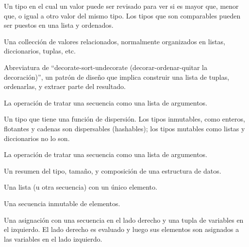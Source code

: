 \begin{description}
\tightlist
\item[comparable]
Un tipo en el cual un valor puede ser revisado para ver si es mayor que,
menor que, o igual a otro valor del mismo tipo. Los tipos que son
comparables pueden ser puestos en una lista y ordenados.
\item[estructura de datos]
Una collección de valores relacionados, normalmente organizados en
listas, diccionarios, tuplas, etc. 
\item[DSU]
Abreviatura de ``decorate-sort-undecorate (decorar-ordenar-quitar la
decoración)'', un patrón de diseño que implica construir una lista de
tuplas, ordenarlas, y extraer parte del resultado. 
\item[reunir]
La operación de tratar una secuencia como una lista de argumentos.
\item[hashable (dispersable)]
Un tipo que tiene una función de dispersión. Los tipos inmutables, como
enteros, flotantes y cadenas son dispersables (hashables); los tipos
mutables como listas y diccionarios no lo son. 
\item[dispersar]
La operación de tratar una secuencia como una lista de argumentos.
\item[modelado (de una estructura de datos)]
Un resumen del tipo, tamaño, y composición de una estructura de datos.
\item[singleton]
Una lista (u otra secuencia) con un único elemento. 
\item[tupla]
Una secuencia inmutable de elementos. 
\item[asignación por tuplas]
Una asignación con una secuencia en el lado derecho y una tupla de
variables en el izquierdo. El lado derecho es evaluado y luego sus
elementos son asignados a las variables en el lado izquierdo.
 
\end{description}




